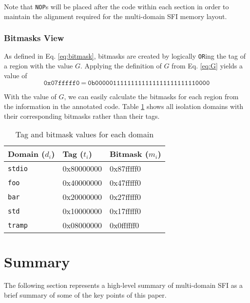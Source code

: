 \documentclass[12pt]{article}
\begin{document}
Note that \texttt{NOP}s will be placed after the code within each section in order to maintain the alignment required for the multi-domain SFI memory layout.

\subsubsection{Bitmasks View}

As defined in Eq.  \ref{eq:bitmask}, bitmasks are created by logically \texttt{OR}ing the tag of a region with the value $G$. Applying the definition of $G$ from Eq. \ref{eq:G} yields a value of
$$ \texttt{0x07fffff0}\ =\ \texttt{0b00000111111111111111111111110000} $$

With the value of $G$, we can easily calculate the bitmasks for each region from the information in the annotated code. Table \ref{tbl:masks} shows all isolation domains with their corresponding bitmasks rather than their tags.

\begin{table}[H]
\centering
\begin{tabular}{@{}lll@{}}
\rowcolor[HTML]{EFEFEF} 
\textbf{Domain ($d_i$)} & \textbf{Tag ($t_i$)} & \textbf{Bitmask ($m_i$)} \\ \midrule
\texttt{stdio}          & 0x80000000           & 0x87fffff0               \\
\rowcolor[HTML]{EFEFEF} 
\texttt{foo}            & 0x40000000           & 0x47fffff0               \\
\texttt{bar}            & 0x20000000           & 0x27fffff0               \\
\rowcolor[HTML]{EFEFEF} 
\texttt{std}            & 0x10000000           & 0x17fffff0               \\
\texttt{tramp}          & 0x08000000           & 0x0ffffff0              
\end{tabular}

\caption{Tag and bitmask values for each domain}
\label{tbl:masks}
\end{table}

\section{Summary}

The following section represents a high-level summary of multi-domain SFI as a brief summary of some of the key points of this paper.
\end{document}
